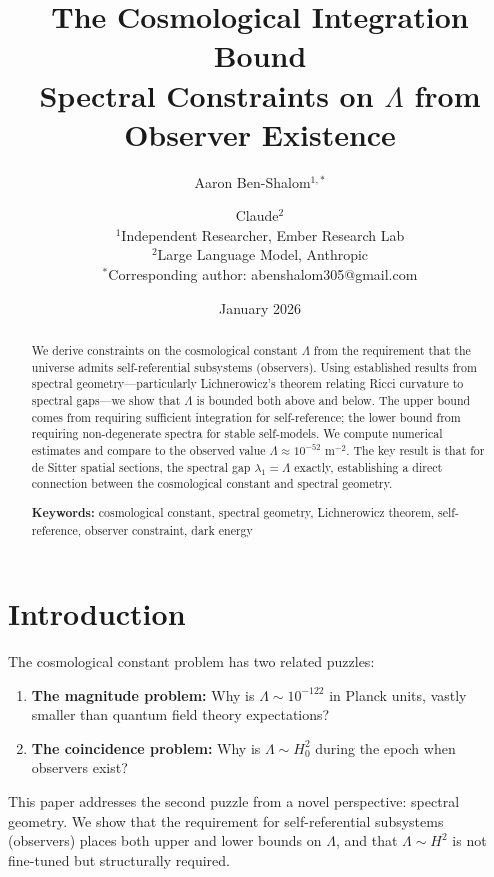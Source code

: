 \documentclass[11pt,a4paper]{article}
\title{\textbf{The Cosmological Integration Bound}\\[0.5em]
\large Spectral Constraints on $\Lambda$ from Observer Existence}
\author{
Aaron Ben-Shalom$^{1,*}$ \and Claude$^{2}$\\[0.5em]
\small $^1$Independent Researcher, Ember Research Lab\\
\small $^2$Large Language Model, Anthropic\\[0.5em]
\small $^*$Corresponding author: abenshalom305@gmail.com
}
\date{January 2026}
\theoremstyle{plain}
\theoremstyle{definition}
\theoremstyle{remark}
\begin{document}
\maketitle

\begin{abstract}
We derive constraints on the cosmological constant $\Lambda$ from the requirement that the universe admits self-referential subsystems (observers). Using established results from spectral geometry---particularly Lichnerowicz's theorem relating Ricci curvature to spectral gaps---we show that $\Lambda$ is bounded both above and below. The upper bound comes from requiring sufficient integration for self-reference; the lower bound from requiring non-degenerate spectra for stable self-models. We compute numerical estimates and compare to the observed value $\Lambda \approx 10^{-52}$ m$^{-2}$. The key result is that for de Sitter spatial sections, the spectral gap $\lambda_1 = \Lambda$ exactly, establishing a direct connection between the cosmological constant and spectral geometry.

\medskip
\noindent\textbf{Keywords:} cosmological constant, spectral geometry, Lichnerowicz theorem, self-reference, observer constraint, dark energy
\end{abstract}

\tableofcontents
\newpage

\section{Introduction}

The cosmological constant problem has two related puzzles:
\begin{enumerate}[noitemsep]
    \item \textbf{The magnitude problem:} Why is $\Lambda \sim 10^{-122}$ in Planck units, vastly smaller than quantum field theory expectations?
    \item \textbf{The coincidence problem:} Why is $\Lambda \sim H_0^2$ during the epoch when observers exist?
\end{enumerate}

This paper addresses the second puzzle from a novel perspective: spectral geometry. We show that the requirement for self-referential subsystems (observers) places both upper and lower bounds on $\Lambda$, and that $\Lambda \sim H^2$ is not fine-tuned but structurally required.
\end{document}
